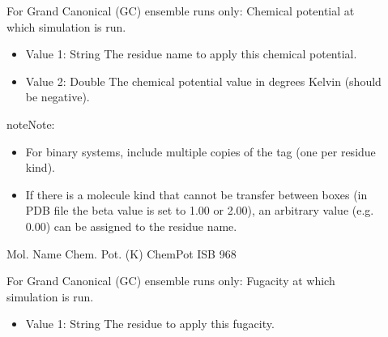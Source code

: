 \documentclass[letterpaper,10pt,english]{sphinxmanual}
\begin{document}
\begin{description}
\item[{}] \leavevmode
For Grand Canonical (GC) ensemble runs only: Chemical potential at which simulation is run.
\begin{itemize}
\item {} 
Value 1: String \sphinxhyphen{} The residue name to apply this chemical potential.

\item {} 
Value 2: Double \sphinxhyphen{} The chemical potential value in degrees Kelvin (should be negative).

\end{itemize}

\begin{sphinxadmonition}{note}{Note:}\begin{itemize}
\item {} 
For binary systems, include multiple copies of the tag (one per residue kind).

\item {} 
If there is a molecule kind that cannot be transfer between boxes (in PDB file the beta value is set to 1.00 or 2.00), an arbitrary value (e.g. 0.00) can be assigned to the residue name.

\end{itemize}
\end{sphinxadmonition}

\begin{sphinxVerbatim}[commandchars=\\\{\}]
\PYGZsh{}\PYGZsh{}\PYGZsh{}\PYGZsh{}\PYGZsh{}\PYGZsh{}\PYGZsh{}\PYGZsh{}\PYGZsh{}\PYGZsh{}\PYGZsh{}\PYGZsh{}\PYGZsh{}\PYGZsh{}\PYGZsh{}\PYGZsh{}\PYGZsh{}\PYGZsh{}\PYGZsh{}\PYGZsh{}\PYGZsh{}\PYGZsh{}\PYGZsh{}\PYGZsh{}\PYGZsh{}\PYGZsh{}\PYGZsh{}\PYGZsh{}\PYGZsh{}\PYGZsh{}\PYGZsh{}\PYGZsh{}\PYGZsh{}
\PYGZsh{} Mol.  Name Chem.  Pot.  (K)
\PYGZsh{}\PYGZsh{}\PYGZsh{}\PYGZsh{}\PYGZsh{}\PYGZsh{}\PYGZsh{}\PYGZsh{}\PYGZsh{}\PYGZsh{}\PYGZsh{}\PYGZsh{}\PYGZsh{}\PYGZsh{}\PYGZsh{}\PYGZsh{}\PYGZsh{}\PYGZsh{}\PYGZsh{}\PYGZsh{}\PYGZsh{}\PYGZsh{}\PYGZsh{}\PYGZsh{}\PYGZsh{}\PYGZsh{}\PYGZsh{}\PYGZsh{}\PYGZsh{}\PYGZsh{}\PYGZsh{}\PYGZsh{}\PYGZsh{}
ChemPot   ISB     \PYGZhy{}968
\end{sphinxVerbatim}

\item[{}] \leavevmode
For Grand Canonical (GC) ensemble runs only: Fugacity at which simulation is run.
\begin{itemize}
\item {} 
Value 1: String \sphinxhyphen{} The residue to apply this fugacity.


\end{itemize}
\end{description}
\end{document}
